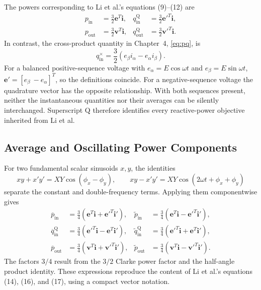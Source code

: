 The powers corresponding to Li et al.'s equations (9)--(12) are
\begin{align}
p_{\mathrm{in}}&=\frac32\mathbf e^T\mathbf i,&
q_{\mathrm{in}}^{\mathrm Q}&=\frac32\mathbf e'^T\mathbf i,
\label{eq:ch5-input-powers}\\
p_{\mathrm{out}}&=\frac32\mathbf v^T\mathbf i,&
q_{\mathrm{out}}^{\mathrm Q}&=\frac32\mathbf v'^T\mathbf i.
\label{eq:ch5-output-powers}
\end{align}
In contrast, the cross-product quantity in Chapter~4, \eqref{eq:pq}, is
\begin{equation}
q_{\mathrm{in}}^{\times}=\frac32(e_\beta i_\alpha-e_\alpha i_\beta).
\label{eq:ch5-cross-q}
\end{equation}
For a balanced positive-sequence voltage with $e_\alpha=E\cos\omega t$ and $e_\beta=E\sin\omega t$, $\mathbf e'=[e_\beta\ -e_\alpha]^T$, so the definitions coincide. For a negative-sequence voltage the quadrature vector has the opposite relationship. With both sequences present, neither the instantaneous quantities nor their averages can be silently interchanged. Superscript $\mathrm Q$ therefore identifies every reactive-power objective inherited from Li et al.

\subsection{Average and Oscillating Power Components}
For two fundamental scalar sinusoids $x,y$, the identities
\begin{equation}
xy+x'y'=XY\cos(\phi_x-\phi_y),\qquad
xy-x'y'=XY\cos(2\omega t+\phi_x+\phi_y)
\label{eq:ch5-products}
\end{equation}
separate the constant and double-frequency terms. Applying them componentwise gives
\begin{align}
\overline p_{\mathrm{in}}&=\frac34(\mathbf e^T\mathbf i+\mathbf e'^T\mathbf i'),&
\widetilde p_{\mathrm{in}}&=\frac34(\mathbf e^T\mathbf i-\mathbf e'^T\mathbf i'),
\label{eq:ch5-input-decomposition}\\
\overline q_{\mathrm{in}}^{\mathrm Q}&=\frac34(\mathbf e'^T\mathbf i-\mathbf e^T\mathbf i'),&
\widetilde q_{\mathrm{in}}^{\mathrm Q}&=\frac34(\mathbf e'^T\mathbf i+\mathbf e^T\mathbf i'),
\label{eq:ch5-q-decomposition}\\
\overline p_{\mathrm{out}}&=\frac34(\mathbf v^T\mathbf i+\mathbf v'^T\mathbf i'),&
\widetilde p_{\mathrm{out}}&=\frac34(\mathbf v^T\mathbf i-\mathbf v'^T\mathbf i').
\label{eq:ch5-output-decomposition}
\end{align}
The factors $3/4$ result from the $3/2$ Clarke power factor and the half-angle product identity. These expressions reproduce the content of Li et al.'s equations (14), (16), and (17), using a compact vector notation.

